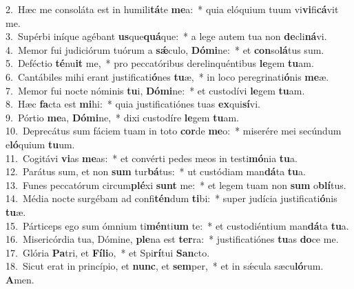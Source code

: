 {2.~}Hæc me consoláta est in humili\textbf{tá}te \textbf{me}a:~* quia elóquium tuum vi\textbf{vi}fi\textbf{cá}vit me.\\
{3.~}Supérbi iníque agébant \textbf{us}que\textbf{quá}que:~* a lege autem tua non \textbf{de}cli\textbf{ná}vi.\\
{4.~}Memor fui judiciórum tuórum a \textbf{sǽ}culo, \textbf{Dó}\textbf{mi}ne:~* et \textbf{con}so\textbf{lá}tus sum.\\
{5.~}Deféctio \textbf{té}nu\textbf{it} me,~* pro peccatóribus derelinquéntibus \textbf{le}gem \textbf{tu}am.\\
{6.~}Cantábiles mihi erant justificati\textbf{ó}nes \textbf{tu}æ,~* in loco peregrinati\textbf{ó}nis \textbf{me}æ.\\
{7.~}Memor fui nocte nóminis \textbf{tu}i, \textbf{Dó}\textbf{mi}ne:~* et custodívi \textbf{le}gem \textbf{tu}am.\\
{8.~}Hæc \textbf{fa}cta est \textbf{mi}hi:~* quia justificatiónes tuas \textbf{ex}qui\textbf{sí}vi.\\
{9.~}Pórtio \textbf{me}a, \textbf{Dó}\textbf{mi}ne,~* dixi custodíre \textbf{le}gem \textbf{tu}am.\\
{10.~}Deprecátus sum fáciem tuam in toto \textbf{cor}de \textbf{me}o:~* miserére mei secúndum e\textbf{ló}quium \textbf{tu}um.\\
{11.~}Cogitávi \textbf{vi}as \textbf{me}as:~* et convérti pedes meos in testi\textbf{mó}nia \textbf{tu}a.\\
{12.~}Parátus sum, et non \textbf{sum} tur\textbf{bá}tus:~* ut custódiam man\textbf{dá}ta \textbf{tu}a.\\
{13.~}Funes peccatórum circum\textbf{plé}xi \textbf{sunt} me:~* et legem tuam non \textbf{sum} o\textbf{blí}tus.\\
{14.~}Média nocte surgébam ad confi\textbf{tén}dum \textbf{ti}bi:~* super judícia justificati\textbf{ó}nis \textbf{tu}æ.\\
{15.~}Párticeps ego sum ómnium ti\textbf{mén}ti\textbf{um} te:~* et custodiéntium man\textbf{dá}ta \textbf{tu}a.\\
{16.~}Misericórdia tua, Dómine, \textbf{ple}na est \textbf{ter}ra:~* justificatiónes \textbf{tu}as \textbf{do}ce me.\\
{17.~}Glória \textbf{Pa}tri, et \textbf{Fí}\textbf{li}o,~* et Spi\textbf{rí}tui \textbf{San}cto.\\
{18.~}Sicut erat in princípio, et \textbf{nunc}, et \textbf{sem}per,~* et in sǽcula sæcu\textbf{ló}rum. \textbf{A}men.\\
